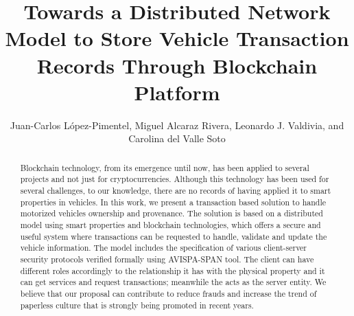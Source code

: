 \begin{frontmatter}






\title{Towards a Distributed Network Model to Store Vehicle Transaction Records Through Blockchain Platform}

\author{Juan-Carlos L\'opez-Pimentel,
        Miguel Alcaraz Rivera,
        Leonardo J. Valdivia,
        and Carolina del Valle Soto%
}

\address{}

\begin{abstract}
Blockchain technology, from its emergence until now, has been applied to several projects and 
not just for cryptocurrencies. 
Although this technology has been used for several challenges, to our knowledge, there are no 
records of having applied it to smart properties in vehicles.
In this work, we present a transaction based solution to handle motorized vehicles ownership 
and provenance. 
The solution is based on a distributed model using smart properties and blockchain technologies,  
which offers a secure and useful system where transactions can be requested to handle, 
validate and update the vehicle information. 
The model includes the specification of various client-server security protocols verified formally using AVISPA-SPAN tool.  
The client can have different roles accordingly to the relationship it has with the 
physical property and it can get services and request transactions;
meanwhile the \blockchaincarnetwork  acts as the server entity. 
We believe that our proposal can contribute to reduce frauds and increase the trend of 
paperless culture that is strongly being promoted in recent years.


\end{abstract}
\end{frontmatter}
